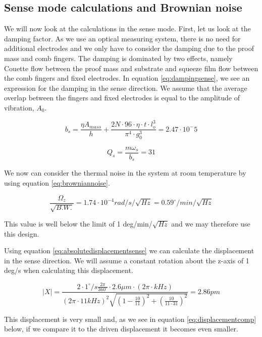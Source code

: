 \documentclass[12pt,a4paper,titlepage]{article}
\begin{document}
\begin{spacing}{1.1}
\subsection{Sense mode calculations and Brownian noise}
We will now look at the calculations in the sense mode. First, let us look at the damping factor. As we use an optical measuring system, there is no need for additional electrodes and we only have to consider the damping due to the proof mass and comb fingers. The damping is dominated by two effects, namely Couette flow between the proof mass and substrate and squeeze film flow between the comb fingers and fixed electrodes. In equation \ref{eq:dampingsense}, we see an expression for the damping in the sense direction. We assume that the average overlap between the fingers and fixed electrodes is equal to the amplitude of vibration, $A_0$.

\begin{equation}
b_s = \dfrac{\eta A_{mass}}{h} + \dfrac{2N \cdot 96 \cdot \eta\cdot t \cdot l_o^3}{\pi^4 \cdot g_0^3}= 2.47 \cdot 10^-5
\label{eq:dampingsense}
\end{equation}

\begin{equation}
Q_s = \dfrac{m \omega_s}{b_s} = 31
\end{equation}

We now can consider the thermal noise in the system at room temperature by using equation \ref{eq:browniannoise}.

\begin{equation}
\dfrac{\Omega_z}{\sqrt{B.W.}} = 1.74\cdot 10^{-4} rad/s/\sqrt{Hz}= 0.59 ^\circ /min/\sqrt{Hz}
\label{eq:browniannoiseactual}
\end{equation}

This value is well below the limit of 1 deg/min/$\sqrt{Hz}$ and we may therefore use this design.

Using equation \ref{eq:absolutedisplacementsense} we can calculate the displacement in the sense direction. We will assume a constant rotation about the z-axis of 1 deg/s when calculating this displacement.

\begin{equation}
\lvert X \rvert = \dfrac{2 \cdot 1 ^\circ /s \frac{2 \pi}{360^\circ} \cdot 2.6\mu m \cdot (2\pi \cdot kHz)}{(2\pi\cdot 11 kHz)^2\sqrt{(1-\frac{10}{11})^2 + (\frac{10}{11\cdot 31})^2}} = 2.86 pm
\label{eq:sensedisplacement}
\end{equation}

This displacement is very small and, as we see in equation \ref{eq:displacementcomp} below, if we compare it to the driven displacement it becomes even smaller.


\end{spacing}
\end{document}
